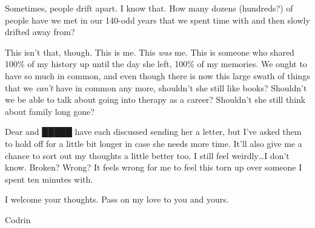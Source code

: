 Sometimes, people drift apart. I know that. How many dozens (hundreds?) of people have we met in our 140-odd years that we spent time with and then slowly drifted away from?

This isn't that, though. This is me. This \emph{was} me. This is someone who shared 100\% of my history up until the day she left, 100\% of my memories. We ought to have so much in common, and even though there is now this large swath of things that we \emph{can't} have in common any more, shouldn't she still like books? Shouldn't we be able to talk about going into therapy as a career? Shouldn't she still think about family long gone?

Dear and █████ have each discussed sending her a letter, but I've asked them to hold off for a little bit longer in case she needs more time. It'll also give me a chance to sort out my thoughts a little better too. I still feel weirdly\ldots I don't know. Broken? Wrong? It feels wrong for me to feel this torn up over someone I spent ten minutes with.

I welcome your thoughts. Pass on my love to you and yours.

Codrin
